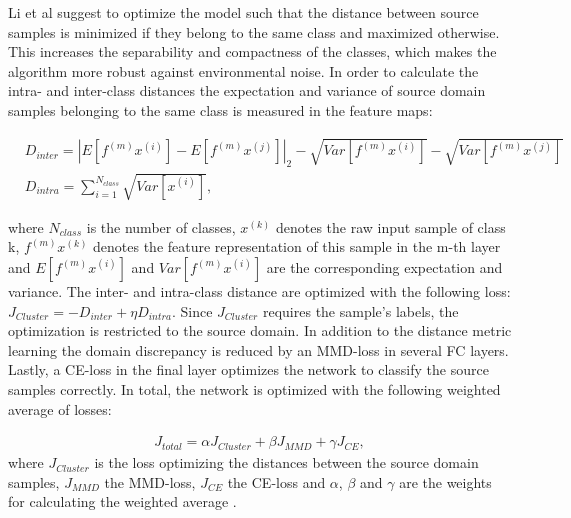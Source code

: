 Li et al suggest to optimize the model such that the distance between source samples is minimized if they belong to the same class and maximized otherwise. This increases the separability and compactness of the classes, which makes the algorithm more robust against environmental noise. In order to calculate the intra- and inter-class distances the expectation and variance of source domain samples belonging to the same class is measured in the feature maps:

\begin{equation}
    \begin{aligned}
       &D_{inter} = |E[f^{(m)}x^{(i)}]-E[f^{(m)}x^{(j)}]|_{2}-\sqrt{Var[f^{(m)}x^{(i)}]}-\sqrt{Var[f^{(m)}x^{(j)}]}\\
       &D_{intra} = 
        \sum_{i=1}^{N_{class}} \sqrt{Var[x^{(i)}]},
    \end{aligned}
\end{equation}

where $N_{class}$ is the number of classes, $x^{(k)}$ denotes the raw input sample of class k, $f^{(m)}x^{(k)}$ denotes the feature representation of this sample in the m-th layer and $E[f^{(m)}x^{(i)}]$ and $Var[f^{(m)}x^{(i)}]$ are the corresponding expectation and variance. The inter- and intra-class distance are optimized with the following loss: $J_{Cluster} = - D_{inter} + \eta D_{intra}$. Since $J_{Cluster}$ requires the sample's labels, the optimization is restricted to the source domain. In addition to the distance metric learning the domain discrepancy is reduced by an MMD-loss in several FC layers. Lastly, a CE-loss in the final layer optimizes the network to classify the source samples correctly. In total, the network is optimized with the following weighted average of losses: 

\begin{equation}
    \begin{aligned}
    J_{total} = \alpha J_{Cluster} + \beta J_{MMD} + \gamma J_{CE}, 
    \end{aligned}
\end{equation}
where $J_{Cluster}$ is the loss optimizing the distances between the source domain samples, $J_{MMD}$ the MMD-loss,  $J_{CE}$ the CE-loss and $\alpha$, $\beta$ and $\gamma$ are the weights for calculating the weighted average \cite{Li2018}.



